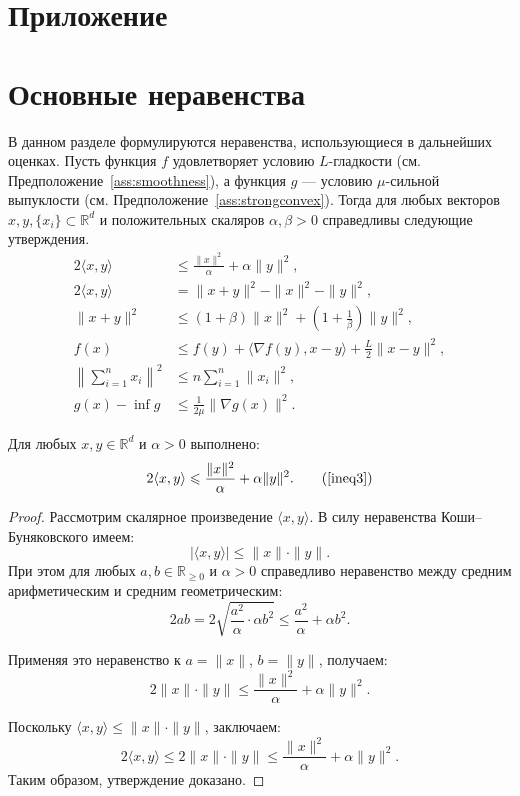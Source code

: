 \section*{Приложение}

\section{Основные неравенства}\label{sec:basicineq}
В данном разделе формулируются неравенства, использующиеся в дальнейших оценках. Пусть функция \(f\) удовлетворяет условию \(L\)-гладкости (см. Предположение~\ref{ass:smoothness}), а функция \(g\) — условию \(\mu\)-сильной выпуклости (см. Предположение~\ref{ass:strongconvex}). Тогда для любых векторов \(x, y, \{x_i\} \subset \mathbb{R}^d\) и положительных скаляров \(\alpha, \beta > 0\) справедливы следующие утверждения.
\begin{align}
\label{ineq3} \tag{Scalar} 2\langle x, y \rangle & \leqslant \frac{\|x\|^2}{\alpha} + \alpha \|y\|^2, \\
\label{ineq:norm} \tag{Norm} 2\langle x, y \rangle & = \|x + y\|^2 - \|x\|^2 - \|y\|^2, \\
\label{ineq:square} \tag{Quad} \|x + y\|^2 & \leqslant (1 + \beta)\|x\|^2 + \left(1 + \frac{1}{\beta}\right)\|y\|^2, \\
\label{ineq4} \tag{Lip} f(x) & \leqslant f(y) + \langle \nabla f(y), x-y \rangle + \frac{L}{2} \|x-y\|^2,\\
\label{ineq1} \tag{CS}  \left\|\sum_{i=1}^{n} x_i\right\|^2 & \leqslant  n \sum_{i=1}^{n} \|x_i\|^2, \\
\label{PL} \tag{PL}  g(x) - \inf g  &\leqslant \frac{1}{2\mu} \|\nabla g(x)\|^2.
\end{align}
\begin{lemma}\label{lem:scalar}
Для любых \(x, y \in \mathbb{R}^d\) и \(\alpha > 0\) выполнено:
\[
2\langle x, y \rangle \leqslant \frac{\|x\|^2}{\alpha} + \alpha \|y\|^2. \tag{\ref{ineq3}}
\]
\end{lemma}
\begin{proof}
Рассмотрим скалярное произведение \(\langle x, y \rangle\). В силу неравенства Коши–Буняковского имеем:
\[
|\langle x, y \rangle| \leqslant \|x\| \cdot \|y\|.
\]
При этом для любых \(a, b \in \mathbb{R}_{\geq 0}\) и \(\alpha > 0\) справедливо неравенство между средним арифметическим и средним геометрическим:
\[
2ab = 2 \sqrt{\frac{a^2}{\alpha} \cdot \alpha b^2} \leqslant \frac{a^2}{\alpha} + \alpha b^2.
\]

Применяя это неравенство к \(a = \|x\|\), \(b = \|y\|\), получаем:
\[
2\|x\| \cdot \|y\| \leqslant \frac{\|x\|^2}{\alpha} + \alpha \|y\|^2.
\]

Поскольку \(\langle x, y \rangle \leqslant \|x\| \cdot \|y\|\), заключаем:
\[
2\langle x, y \rangle \leqslant 2\|x\| \cdot \|y\| \leqslant \frac{\|x\|^2}{\alpha} + \alpha \|y\|^2.
\]
Таким образом, утверждение доказано.
\end{proof}

